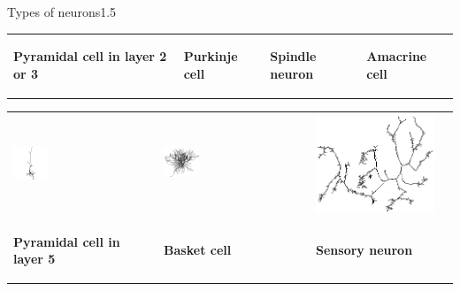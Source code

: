 \documentclass[a4paper,11pt]{article}
\begin{document}
\begin{exercise}{3}{Types of neurons}{1.5}
\begin{tabular}{p{3.7cm} p{3.7cm} p{3.7cm} p{3.7cm}}
\begin{center}\textbf{Pyramidal cell in layer 2 or 3}\end{center}&
\begin{center}\textbf{Purkinje cell}\end{center}&
\begin{center}\textbf{Spindle neuron}\end{center}&
\begin{center}\textbf{Amacrine cell}\end{center} \\
\end{tabular}
\begin{tabular}{p{3.7cm} p{3.7cm} p{3.7cm} p{3.7cm}}
\includegraphics[width=0.25\textwidth]{pyramidal5.png} &
\includegraphics[width=0.25\textwidth]{bascet.png} &
\includegraphics[height=0.25\textwidth]{sensory.png} &
 \\

\begin{center}\textbf{Pyramidal cell in layer 5}\end{center}&
\begin{center}\textbf{Basket cell}\end{center}&
\begin{center}\textbf{Sensory neuron}\end{center}&
\begin{center}\textbf{}\end{center} \\
\end{tabular}



\end{exercise}
\end{document}
